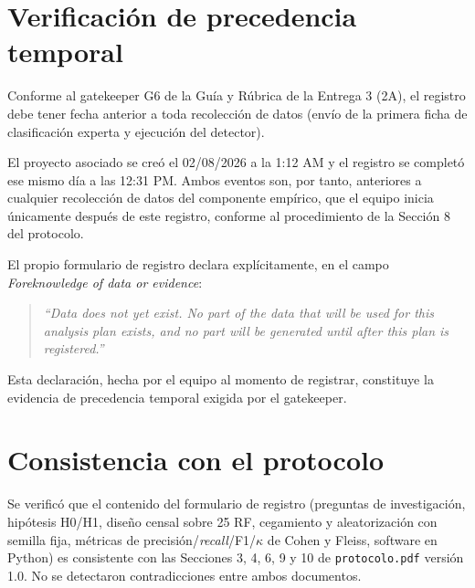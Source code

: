 \documentclass[11pt,a4paper]{article}
\begin{document}
\section*{Verificación de precedencia temporal}

Conforme al gatekeeper G6 de la Guía y Rúbrica de la Entrega 3 (2A), el registro debe
tener fecha anterior a toda recolección de datos (envío de la primera ficha de
clasificación experta y ejecución del detector).

El proyecto asociado se creó el 02/08/2026 a la 1:12 AM y el registro se completó ese
mismo día a las 12:31 PM. Ambos eventos son, por tanto, anteriores a cualquier
recolección de datos del componente empírico, que el equipo inicia únicamente después
de este registro, conforme al procedimiento de la Sección 8 del protocolo.

El propio formulario de registro declara explícitamente, en el campo
\textit{Foreknowledge of data or evidence}:

\begin{quote}
\itshape
``Data does not yet exist. No part of the data that will be used for this analysis
plan exists, and no part will be generated until after this plan is registered.''
\end{quote}

Esta declaración, hecha por el equipo al momento de registrar, constituye la evidencia
de precedencia temporal exigida por el gatekeeper.

\section*{Consistencia con el protocolo}

Se verificó que el contenido del formulario de registro (preguntas de investigación,
hipótesis H0/H1, diseño censal sobre 25 RF, cegamiento y aleatorización con semilla
fija, métricas de precisión/\textit{recall}/F1/$\kappa$ de Cohen y Fleiss, software en
Python) es consistente con las Secciones 3, 4, 6, 9 y 10 de \texttt{protocolo.pdf}
versión 1.0. No se detectaron contradicciones entre ambos documentos.

\end{document}
